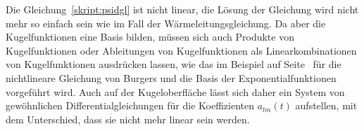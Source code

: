 Die Gleichung~\eqref{skript:psidgl} ist nicht linear, die Lösung
der Gleichung wird nicht mehr so einfach sein wie im Fall der
Wärmeleitungsgleichung.
Da aber die Kugelfunktionen eine Basis bilden, müssen sich auch
Produkte von Kugelfunktionen oder Ableitungen von Kugelfunktionen
als Linearkombinationen von Kugelfunktionen ausdrücken lassen,
wie das im Beispiel auf Seite~\pageref{subsubsection:komplexeres}
für die nichtlineare Gleichung von Burgers und die Basis der
Exponentialfunktionen vorgeführt wird.
Auch auf der Kugeloberfläche lässt sich daher ein System von gewöhnlichen
Differentialgleichungen für die Koeffizienten $a_{lm}(t)$ aufstellen,
mit dem Unterschied, dass sie nicht mehr linear sein werden.







